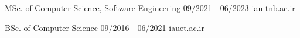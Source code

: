 \documentclass[a4paper,12pt]{memoir} %
\begin{document}

\Sep %


\clearpage %

\userinformation %

\framebreak %






{MSc. of Computer Science, Software Engineering}
{09/2021 - 06/2023}
{}
{iau-tnb.ac.ir}

{BSc. of Computer Science}
{09/2016 - 06/2021}
{}
{iauet.ac.ir}


\Sep %






\end{document}

